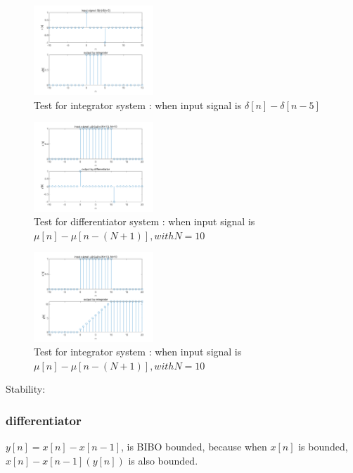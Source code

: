 \documentclass[journal]{IEEEtran}
\begin{document}
\begin{figure}[H]
   \centering
   \includegraphics[width=0.4\textwidth]{2.3.2.png} %
   \caption{Test for integrator system : when input signal is $\delta[n]-\delta[n-5]$}
   \label{fig:2.3.2}
\end{figure}
\begin{figure}[H]
   \centering
   \includegraphics[width=0.4\textwidth]{2.3.3.png} %
   \caption{Test for differentiator system : when input signal is $\mu[n]-\mu[n-(N+1)], with N=10$}
   \label{fig:2.3.3}
\end{figure}
\begin{figure}[H]
   \centering
   \includegraphics[width=0.4\textwidth]{2.3.4.png} %
   \caption{Test for integrator system : when input signal is $\mu[n]-\mu[n-(N+1)], with N=10$}
   \label{fig:2.3.4}
\end{figure}

Stability:
\subsubsection{differentiator} $y[n]=x[n]-x[n-1]$, is BIBO bounded, because when $x[n]$ is bounded, $x[n]-x[n-1](y[n])$ is also bounded.
\end{document}
